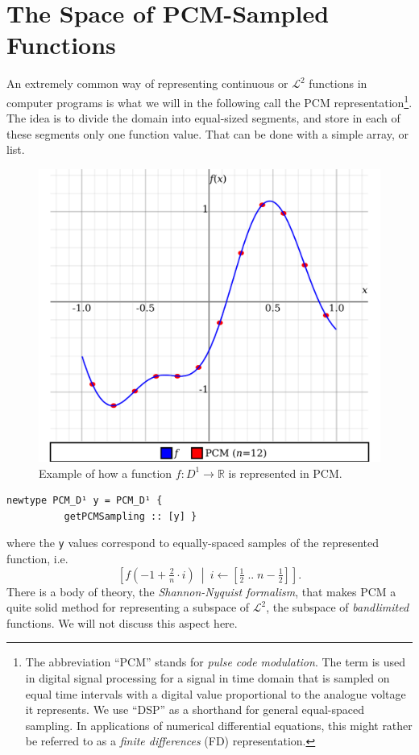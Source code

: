 \documentclass[sigplan,screen]{acmart}
\theoremstyle{acmplain}
\theoremstyle{acmdefinition}
\begin{document}
\section{The Space of PCM-Sampled Functions}
An extremely common way of representing continuous or $\mathcal{L}^2$ functions in computer programs is what we will in the following call the PCM representation\footnote{%
The abbreviation “PCM” stands for \emph{pulse code modulation}. The term is used in digital signal processing for a signal in time domain that is sampled on equal time intervals with a digital value proportional to the analogue voltage it represents. We use “DSP” as a shorthand for general equal-spaced sampling. In applications of numerical differential equations, this might rather be referred to as a \emph{finite differences} (FD) representation.
}. The idea is to divide the domain into equal-sized segments, and store in each of these segments only one function value. That can be done with a simple array, or list.
\begin{figure}
 \centering
 \includegraphics[width=\linewidth]{simple-PCM-example.pdf}
 \caption{Example of how a function $f:D^1\to\mathbb{R}$ is represented in PCM.}
 \label{haarDomDecompose}
\end{figure}
\begin{lstlisting}
newtype PCM_D¹ y = PCM_D¹ {
          getPCMSampling :: [y] }
\end{lstlisting}
where the \lstinline`y` values correspond to equally-spaced samples of the represented function, i.e.
\[
  \left[f(-1 + \tfrac2n\cdot i)\ \middle|\ i\leftarrow[\tfrac12\;..\;n-\tfrac12]\right].
\]
There is a body of theory, the \emph{Shannon-Nyquist formalism}, that makes PCM a quite solid method for representing a subspace of $\mathcal{L}^2$, the subspace of \emph{bandlimited} functions. We will not discuss this aspect here. 
\end{document}
